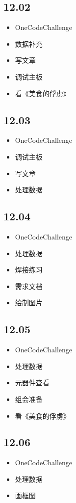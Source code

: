 \documentclass[UTF8]{ctexart}
\begin{document}
\subsection*{12.02}
\begin{itemize}
    \item OneCodeChallenge
    \item 数据补充
    \item 写文章
    \item 调试主板
    \item 看《美食的俘虏》
\end{itemize}

\subsection*{12.03}
\begin{itemize}
    \item OneCodeChallenge
    \item 调试主板
    \item 写文章
    \item 处理数据
\end{itemize}

\subsection*{12.04}
\begin{itemize}
    \item OneCodeChallenge
    \item 处理数据
    \item 焊接练习
    \item 需求文档
    \item 绘制图片
\end{itemize}

\subsection*{12.05}
\begin{itemize}
    \item OneCodeChallenge
    \item 处理数据
    \item 元器件查看
    \item 组会准备
    \item 看《美食的俘虏》
\end{itemize}

\subsection*{12.06}
\begin{itemize}
    \item OneCodeChallenge
    \item 处理数据
    \item 画框图
\end{itemize}
\end{document}
